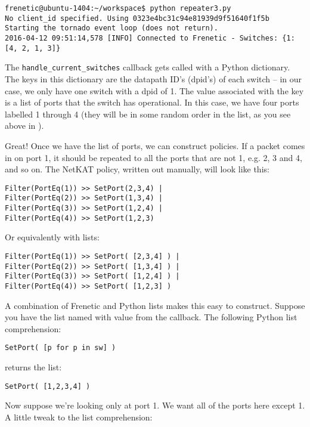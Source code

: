 \begin{verbatim}
frenetic@ubuntu-1404:~/workspace$ python repeater3.py
No client_id specified. Using 0323e4bc31c94e81939d9f51640f1f5b
Starting the tornado event loop (does not return).
2016-04-12 09:51:14,578 [INFO] Connected to Frenetic - Switches: {1: [4, 2, 1, 3]}
\end{verbatim}

The \texttt{handle\_current\_switches} callback gets called with a Python dictionary.  
The keys in this dictionary are the datapath ID's (dpid's) of each switch -- in our case, we only have
one switch with a dpid of 1.
The value associated with the key is a list of ports that the switch has operational.  
In this case, we have four ports labelled 1 through 4 (they will be in some random order in the list, as
you see above in \python{[4, 2, 1, 3]}).

Great!  Once we have the list of ports, we can construct policies.  If a packet comes in on port
1, it should be repeated to all the ports that are not 1, e.g. 2, 3 and 4, and so on.   
The NetKAT policy, written out manually, will look like this:

\begin{verbatim}
Filter(PortEq(1)) >> SetPort(2,3,4) |
Filter(PortEq(2)) >> SetPort(1,3,4) |
Filter(PortEq(3)) >> SetPort(1,2,4) |
Filter(PortEq(4)) >> SetPort(1,2,3)
\end{verbatim}

Or equivalently with lists:

\begin{verbatim}
Filter(PortEq(1)) >> SetPort( [2,3,4] ) |
Filter(PortEq(2)) >> SetPort( [1,3,4] ) |
Filter(PortEq(3)) >> SetPort( [1,2,4] ) |
Filter(PortEq(4)) >> SetPort( [1,2,3] )
\end{verbatim}

A combination of Frenetic and Python lists makes this easy to construct.  
Suppose you have the list named  with value 
\python{[1, 2, 3, 4]} from the callback.   The following Python list comprehension:

\begin{verbatim}
SetPort( [p for p in sw] )
\end{verbatim}

returns the list:

\begin{verbatim}
SetPort( [1,2,3,4] )
\end{verbatim}

Now suppose we're looking only at port 1.  We want all of the ports here 
except 1.  A little tweak to the list comprehension:

